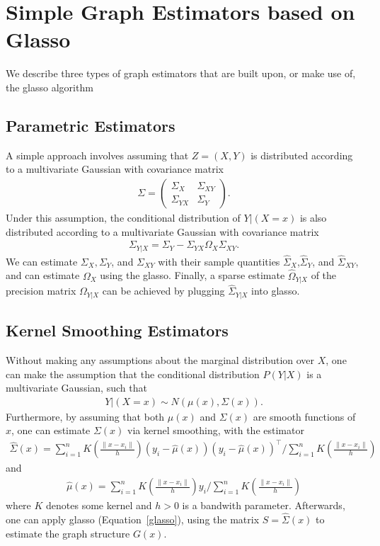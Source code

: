 \documentclass[12pt]{article}
\begin{document}
\section{Simple Graph Estimators based on Glasso}
\label{simpleEstimators}

We describe three types of graph estimators that are built upon, or make use of, the glasso algorithm

\subsection{Parametric Estimators}
A simple approach involves assuming that $Z = (X,Y)$ is distributed according to a multivariate Gaussian with covariance matrix
\begin{align}
    \Sigma = \left( \begin{matrix} \Sigma_X& \Sigma_{XY} \\ \Sigma_{YX} & \Sigma_Y \end{matrix} \right).
\end{align}
Under this assumption, the conditional distribution of $Y|(X=x)$ is also distributed according to a multivariate Gaussian with covariance matrix
\begin{align}
    \Sigma_{Y|X} = \Sigma_Y - \Sigma_{YX}\Omega_X\Sigma_{XY}.
\end{align}
We can estimate $\Sigma_X,\Sigma_Y$, and $\Sigma_{XY}$ with their sample quantities $\hat{\Sigma}_X$,$\hat{\Sigma}_Y$, and $\hat{\Sigma}_{XY}$, and can estimate $\Omega_X$ using the glasso. Finally, a sparse estimate $\hat{\Omega}_{Y|X}$ of the precision matrix $\Omega_{Y|X}$ can be achieved by plugging $\hat{\Sigma}_{Y|X}$ into glasso.

\subsection{Kernel Smoothing Estimators}
Without making any assumptions about the marginal distribution over $X$, one can make the assumption that the conditional distribution $P(Y|X)$ is a multivariate Gaussian, such that
\begin{align}
    Y|(X=x) \sim N(\mu(x),\Sigma(x)).
\end{align}
Furthermore, by assuming that both $\mu(x)$ and $\Sigma(x)$ are smooth functions of $x$, one can estimate $\Sigma(x)$ via kernel smoothing, with the estimator
\begin{align}
    \hat{\Sigma}(x) = \sum_{i=1}^n K \left( \frac{\|x-x_i\|}{h} \right) (y_i - \hat{\mu}(x)) (y_i - \hat{\mu}(x))^{\top} / \sum_{i=1}^n K \left( \frac{\| x - x_i \|}{h} \right)
\end{align}
and
\begin{align}
    \hat{\mu}(x) = \sum_{i=1}^n K\left( \frac{\|x-x_i\|}{h} \right) y_i / \sum_{i=1}^n K\left( \frac{\|x-x_i\|}{h} \right)
\end{align}
where $K$ denotes some kernel and $h>0$ is a bandwith parameter. Afterwards, one can apply glasso (Equation~\ref{glasso}), using the matrix $S = \hat{\Sigma}(x)$ to estimate the graph structure $G(x)$.
\end{document}
